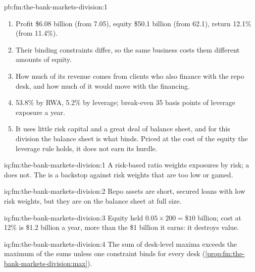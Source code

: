 \begin{solution}{pb:fm:the-bank-markets-division:1}
\begin{enumerate}
\item Profit \$6.08 billion (from 7.05), equity \$50.1 billion (from 62.1), return 12.1\% (from 11.4\%).
\item Their binding constraints differ, so the same business costs them different amounts of equity.
\item How much of its revenue comes from clients who also finance with the repo desk, and how much of it would move with the financing.
\item 53.8\% by RWA, 5.2\% by leverage; break-even  35 basis points of leverage exposure a year.
\item It uses little risk capital and a great deal of balance sheet, and for this division the balance sheet is what binds. Priced at the cost of
the equity the leverage rule holds, it does not earn its hurdle.
\end{enumerate}
\end{solution}

\begin{solution}{iq:fm:the-bank-markets-division:1}
A risk-based ratio weights exposures by risk; a  does not. The  is a backstop against risk weights that are too low or
gamed.
\end{solution}

\begin{solution}{iq:fm:the-bank-markets-division:2}
Repo assets are short, secured loans with low risk weights, but they are on the balance sheet at full size.
\end{solution}

\begin{solution}{iq:fm:the-bank-markets-division:3}
Equity held $0.05\times200=\$10$ billion; cost at 12\% is \$1.2 billion a year, more than the \$1 billion it earns: it destroys value.
\end{solution}

\begin{solution}{iq:fm:the-bank-markets-division:4}
The sum of desk-level maxima exceeds the maximum of the sums unless one constraint binds for every desk
(\cref{prop:fm:the-bank-markets-division:max}).
\end{solution}

